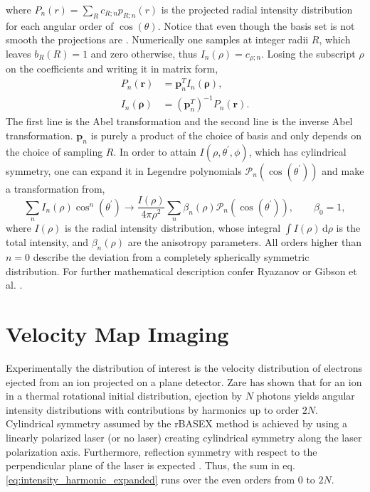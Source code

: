 \documentclass[12pt]{article}
\begin{document}
where $P_n(r)=\sum_{R}c_{R;n}p_{R;n}(r)$ is the projected radial intensity distribution for each angular order of $\cos(\theta)$. Notice that even though the basis set is not smooth the projections are \cite{ryazanov_development_2012,gibson_stephen_pyabelpyabel_2022}. Numerically one samples at integer radii $R$, which leaves $b_R(R)=1$ and zero otherwise, thus $I_n(\rho)=c_{\rho;n}$. Losing the subscript $\rho$ on the coefficients and writing it in matrix form,
\begin{align*}
    P_n(\bm{r})&=\bm{p}_n^TI_n(\bm{\rho}),\\
    I_n(\bm{\rho})&=\left(\bm{p}_n^T\right)^{-1}P_n(\bm{r}).
\end{align*}
The first line is the Abel transformation and the second line is the inverse Abel transformation. $\bm{p}_n$ is purely a product of the choice of basis and only depends on the choice of sampling $R$. In order to attain $I(\rho,\theta^\prime,\phi)$, which has cylindrical symmetry, one can expand it in Legendre polynomials $\mathcal{P}_n(\cos(\theta^\prime))$ and make a transformation from,
\begin{equation}
     \sum_nI_n(\rho)\cos^n(\theta^\prime)\rightarrow\frac{I(\rho)}{4\pi\rho^2}\sum_n\beta_n(\rho)\mathcal{P}_n(\cos(\theta^\prime)),\qquad\beta_0=1,
     \label{eq:intensity_harmonic_expanded}
\end{equation}
where $I(\rho)$ is the radial intensity distribution, whose integral $\int I(\rho)\,\mathrm{d}\rho$ is the total intensity, and $\beta_n(\rho)$ are the anisotropy parameters. All orders higher than $n=0$ describe the deviation from a completely spherically symmetric distribution. For further mathematical description confer Ryazanov \cite{ryazanov_development_2012} or Gibson et al. \cite{gibson_stephen_pyabelpyabel_2022}.
\section{Velocity Map Imaging}
Experimentally the distribution of interest is the velocity distribution of electrons ejected from an ion projected on a plane detector. Zare \cite{zare_photoejection_1972} has shown that for an ion in a thermal rotational initial distribution, ejection by $N$ photons yields angular intensity distributions with contributions by harmonics up to order $2N$. Cylindrical symmetry assumed by the rBASEX method is achieved by using a linearly polarized laser (or no laser) creating cylindrical symmetry along the laser polarization axis. Furthermore, reflection symmetry with respect to the perpendicular plane of the laser is expected \cite{ryazanov_development_2012}. Thus, the sum in eq. \ref{eq:intensity_harmonic_expanded} runs over the even orders from $0$ to $2N$.
\end{document}
